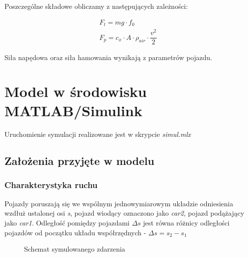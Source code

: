 \documentclass[12pt, a4paper, headings=normal]{article}
\begin{document}
Poszczególne składowe obliczamy z następujących zależności:

\begin{equation}
\begin{array}{l}
	F_t = m g \cdot f_0 \\
	F_p = c_x \cdot A \cdot \rho_{air} \cdot \dfrac{v^2}{2}
	\label{eq:drags}
\end{array}
\end{equation}

Siła napędowa oraz siła hamowania wynikają z parametrów pojazdu. 

\section{Model w środowisku MATLAB/Simulink}

Uruchomienie symulacji realizowane jest w skrypcie \textit{simul.mlx}

\subsection{Założenia przyjęte w modelu}

\subsubsection{Charakterystyka ruchu}

Pojazdy poruszają się we wspólnym jednowymiarowym układzie odniesienia wzdłuż
ustalonej osi \textit{s}, pojazd wiodący oznaczono jako \textit{car2}, pojazd
podążający jako \textit{car1}. Odległość pomiędzy pojazdami $\Delta s$ jest równa
różnicy odległości pojazdów od początku układu współrzędnych - $\Delta s = s_2 - s_1$

\begin{figure}[H]
	\centering
	\caption{Schemat symulowanego zdarzenia}
\end{figure}
\end{document}
